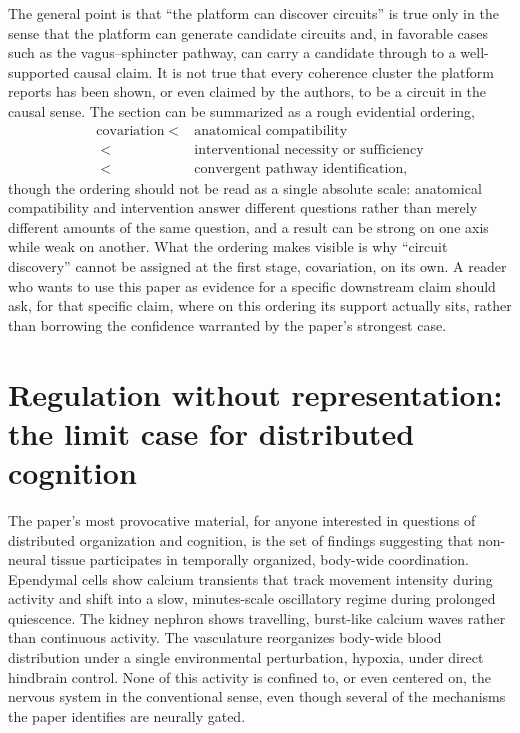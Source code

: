 \documentclass[11pt]{article}
\begin{document}
The general point is that ``the platform can discover circuits'' is true only in the sense that the platform can generate candidate circuits and, in favorable cases such as the vagus--sphincter pathway, can carry a candidate through to a well-supported causal claim. It is not true that every coherence cluster the platform reports has been shown, or even claimed by the authors, to be a circuit in the causal sense. The section can be summarized as a rough evidential ordering,
\begin{align*}
\text{covariation}
\;<\;&\text{anatomical compatibility} \\
\;<\;&\text{interventional necessity or sufficiency} \\
\;<\;&\text{convergent pathway identification},
\end{align*}
though the ordering should not be read as a single absolute scale: anatomical compatibility and intervention answer different questions rather than merely different amounts of the same question, and a result can be strong on one axis while weak on another. What the ordering makes visible is why ``circuit discovery'' cannot be assigned at the first stage, covariation, on its own. A reader who wants to use this paper as evidence for a specific downstream claim should ask, for that specific claim, where on this ordering its support actually sits, rather than borrowing the confidence warranted by the paper's strongest case.

\section{Regulation without representation: the limit case for distributed cognition}

The paper's most provocative material, for anyone interested in questions of distributed organization and cognition, is the set of findings suggesting that non-neural tissue participates in temporally organized, body-wide coordination. Ependymal cells show calcium transients that track movement intensity during activity and shift into a slow, minutes-scale oscillatory regime during prolonged quiescence. The kidney nephron shows travelling, burst-like calcium waves rather than continuous activity. The vasculature reorganizes body-wide blood distribution under a single environmental perturbation, hypoxia, under direct hindbrain control. None of this activity is confined to, or even centered on, the nervous system in the conventional sense, even though several of the mechanisms the paper identifies are neurally gated.
\end{document}
